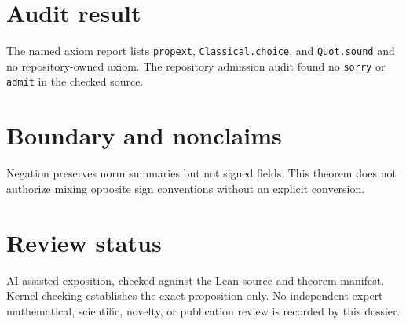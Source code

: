 \documentclass[11pt]{article}
\begin{document}
\section{Audit result}
The named axiom report lists \texttt{propext}, \texttt{Classical.choice}, and
\texttt{Quot.sound} and no repository-owned axiom. The repository admission audit found no
\texttt{sorry} or \texttt{admit} in the checked source.

\section{Boundary and nonclaims}
Negation preserves norm summaries but not signed fields. This theorem does not authorize mixing
opposite sign conventions without an explicit conversion.

\section{Review status}
AI-assisted exposition, checked against the Lean source and theorem manifest. Kernel checking
establishes the exact proposition only. No independent expert mathematical, scientific,
novelty, or publication review is recorded by this dossier.
\end{document}
